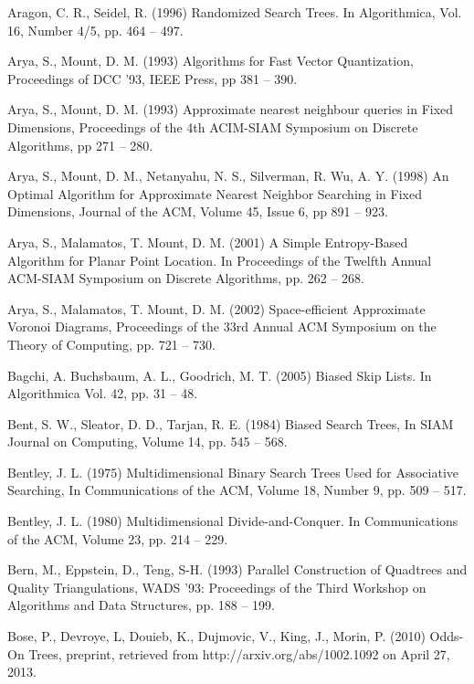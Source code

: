 \documentclass[mcs]{scsthesis}
\begin{document}
\begin{thebibliography}{5}

Aragon, C. R.,  Seidel, R. (1996) Randomized Search Trees.
In Algorithmica, Vol. 16, Number 4/5, pp. 464 -- 497.

Arya, S., Mount, D. M. (1993) Algorithms for Fast Vector Quantization,
Proceedings of DCC '93, IEEE Press, pp 381 -- 390. 

Arya, S., Mount, D. M. (1993) Approximate nearest neighbour queries in Fixed
Dimensions, Proceedings of the 4th ACIM-SIAM Symposium on Discrete Algorithms,
pp 271 -- 280.

Arya, S., Mount, D. M., Netanyahu, N. S., Silverman, R. Wu, A. Y. (1998)
An Optimal Algorithm for Approximate Nearest Neighbor Searching in Fixed
Dimensions, Journal of the ACM, Volume 45, Issue 6, pp 891 -- 923.

Arya, S., Malamatos, T. Mount, D. M. (2001) A Simple Entropy-Based Algorithm
for Planar Point Location. In Proceedings of the Twelfth Annual ACM-SIAM
Symposium on Discrete Algorithms, pp. 262 -- 268.

Arya, S., Malamatos, T. Mount, D. M. (2002) Space-efficient Approximate
Voronoi Diagrams, Proceedings of the 33rd Annual ACM Symposium on the Theory
of Computing, pp. 721 -- 730.

Bagchi, A. Buchsbaum, A. L., Goodrich, M. T. (2005) Biased Skip Lists.
In Algorithmica Vol. 42, pp. 31 -- 48.

Bent, S. W., Sleator, D. D., Tarjan, R. E. (1984) Biased Search Trees,
In SIAM Journal on Computing, Volume 14, pp. 545 -- 568.

Bentley, J. L. (1975) Multidimensional Binary Search Trees Used for Associative
Searching, In Communications of the ACM, Volume 18, Number 9, pp. 509 -- 517.

Bentley, J. L. (1980) Multidimensional Divide-and-Conquer.
In Communications of the ACM, Volume 23, pp. 214 -- 229.

Bern, M., Eppstein, D., Teng, S-H. (1993) Parallel Construction of Quadtrees and
Quality Triangulations, WADS '93: Proceedings of the Third Workshop on
Algorithms and Data Structures, pp. 188 -- 199. 

Bose, P., Devroye, L, Douieb, K., Dujmovic, V., King, J., Morin, P. (2010)
Odds-On Trees, preprint, retrieved from http://arxiv.org/abs/1002.1092 on
April 27, 2013.


\end{thebibliography}
\end{document}
